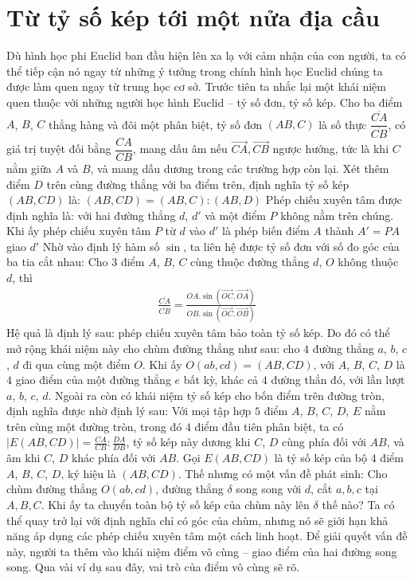 \section{Từ tỷ số kép tới một nửa địa cầu}
Dù hình học phi Euclid ban đầu hiện lên xa lạ với cảm nhận của con người, ta có thể tiếp cận nó ngay từ những ý tưởng trong chính hình học Euclid chúng ta được làm quen ngay từ trung học cơ sở. Trước tiên ta nhắc lại một khái niệm quen thuộc với những người học hình Euclid -- tỷ số đơn, tỷ số kép.
	\vskip 0.1cm
	Cho ba điểm $A$, $B$, $C$ thẳng hàng và đôi một phân biệt, tỷ số đơn $(AB, C)$ là số thực $ \dfrac{\overline{CA}}{\overline{CB}}$, có giá trị tuyệt đối bằng $\dfrac{CA}{CB}$, mang dấu âm nếu $ \vec{CA}, \vec{CB}$ ngược hướng, tức là khi $C$ nằm giữa $A$ và $B$, và mang dấu dương trong các trường hợp còn lại. 
	\vskip 0.1cm
	Xét thêm điểm $D$ trên cùng đường thẳng với ba điểm trên, định nghĩa tỷ số kép $(AB, CD)$ là:
	$(AB, CD) = (AB, C) : (AB, D)$
	Phép chiếu xuyên tâm được định nghĩa là: với hai đường thẳng $d$, $d'$ và một điểm $P$ không nằm trên chúng. Khi ấy phép chiếu xuyên tâm $P$ từ $d$ vào $d'$ là phép biến điểm $A$ thành $A' = PA$ giao $d'$
	\vskip 0.1cm
Nhờ vào định lý hàm số $\sin$, ta liên hệ được tỷ số đơn với số đo góc của ba tia cắt nhau: Cho $3$ điểm $A$, $B$, $C$ cùng thuộc đường thẳng $d$, $O$ không thuộc $d$, thì
	\begin{align*}
		\frac{ \overline{CA}}{\overline{CB}} = \frac{ OA. \sin( \vec{OC} , \vec{OA} )}{OB. \sin( \vec{OC}, \vec{OB})}
	\end{align*}	
	Hệ quả là định lý sau: phép chiếu xuyên tâm bảo toàn tỷ số kép. Do đó có thể mở rộng khái niệm này cho chùm đường thẳng như sau: cho $4$ đường thẳng $a$, $b$, $c$, $d$ đi qua cùng một điểm $O$. Khi ấy $O(ab,cd) = (AB, CD)$, với $A$, $B$, $C$, $D$ là $4$ giao điểm của một đường thẳng $e$ bất kỳ, khác cả $4$ đường thẳn đó, với lần lượt $a$, $b$, $c$, $d$.   
	\vskip 0.1cm
	Ngoài ra còn có khái niệm tỷ số kép cho bốn điểm trên đường tròn, định nghĩa được nhờ định lý sau:
	\vskip 0.1cm
	Với mọi tập hợp $5$ điểm $A$, $B$, $C$, $D$, $E$ nằm trên cùng một đường tròn, trong đó $4$ điểm đầu tiên phân biệt, ta có $|E(AB, CD)| = \frac{CA}{CB}: \frac{DA}{DB}$, tỷ số kép này dương khi $C$, $D$ cùng phía đối với $AB$, và âm khi $C$, $D$ khác phía đối với $AB$. Gọi $E(AB, CD)$ là tỷ số kép của bộ $4$ điểm $A$, $B$, $C$, $D$, ký hiệu là $(AB, CD)$.
	\vskip 0.1cm
Thế nhưng có một vấn đề phát sinh: Cho chùm đường thẳng $O(ab, cd)$, đường thẳng $\delta$ song song với $d$, cắt $a, b, c$ tại $A, B, C$. Khi ấy ta chuyển toàn bộ tỷ số kép của chùm này lên $\delta$ thế nào? Ta có thể quay trở lại với định nghĩa chỉ có góc của chùm, nhưng nó sẽ giới hạn khả năng áp dụng các phép chiếu xuyên tâm một cách linh hoạt. Để giải quyết vấn đề này, người ta thêm vào khái niệm điểm vô cùng -- giao điểm của hai đường song song. Qua vài ví dụ sau đây, vai trò của điểm vô cùng sẽ rõ. 
